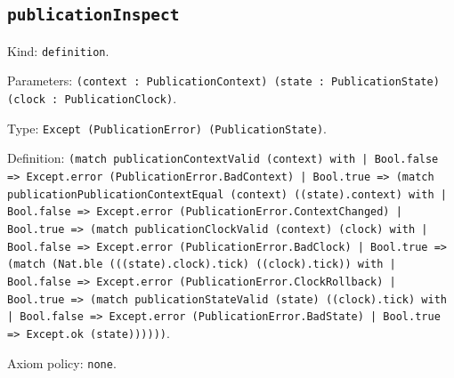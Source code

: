 \documentclass[11pt]{article}
\begin{document}
\subsection*{\texttt{publicationInspect}}
\noindent Kind: \texttt{definition}.\par
\noindent Parameters: \texttt{(context : PublicationContext) (state : PublicationState) (clock : PublicationClock)}.\par
\noindent Type: \texttt{Except (PublicationError) (PublicationState)}.\par
\noindent Definition: \texttt{(match publicationContextValid (context) with | Bool.false => Except.error (PublicationError.BadContext) | Bool.true => (match publicationPublicationContextEqual (context) ((state).context) with | Bool.false => Except.error (PublicationError.ContextChanged) | Bool.true => (match publicationClockValid (context) (clock) with | Bool.false => Except.error (PublicationError.BadClock) | Bool.true => (match (Nat.ble (((state).clock).tick) ((clock).tick)) with | Bool.false => Except.error (PublicationError.ClockRollback) | Bool.true => (match publicationStateValid (state) ((clock).tick) with | Bool.false => Except.error (PublicationError.BadState) | Bool.true => Except.ok (state))))))}.\par
\noindent Axiom policy: \texttt{none}.\par
\end{document}
